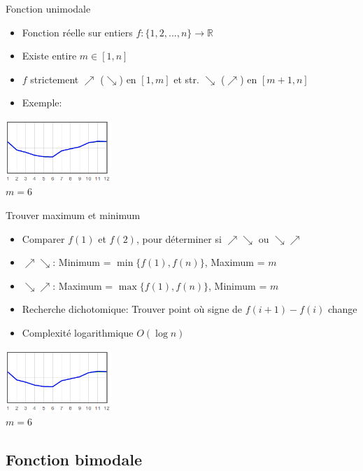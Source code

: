 \documentclass{beamer}
\begin{document}
\begin{frame}{Fonction unimodale}
	\begin{itemize}
	\item Fonction réelle sur entiers $f : \{ 1, 2, ..., n \} \rightarrow \mathbb{R}$
	\item Existe entire $m \in [1, n]$
	\item $f$ strictement $\nearrow$ ($\searrow$) en $[1, m]$ et str. $\searrow$ ($\nearrow$) en $[m+1, n]$
	\item Exemple:
	\end{itemize}
	\begin{center}
	\includegraphics[width=4cm]{unimodal.png}
	\\
	$m = 6$
	\end{center}
\end{frame}

\begin{frame}{Trouver maximum et minimum}
	\begin{itemize}
	\item Comparer $f(1)$ et $f(2)$, pour déterminer si $\nearrow\searrow$ ou $\searrow\nearrow$
	\item $\nearrow\searrow$: Minimum = $\min \{ f(1), f(n) \}$, Maximum = $m$
	\item $\searrow\nearrow$: Maximum = $\max \{ f(1), f(n) \}$, Minimum = $m$
	\item Recherche dichotomique: Trouver point où signe de $f(i+1) - f(i)$ change
	\item Complexité logarithmique $O(\log n)$
	\end{itemize}
	\begin{center}
	\includegraphics[width=4cm]{unimodal.png}
	\\
	$m = 6$
	\end{center}
\end{frame}

\subsection{Fonction bimodale}
\end{document}
